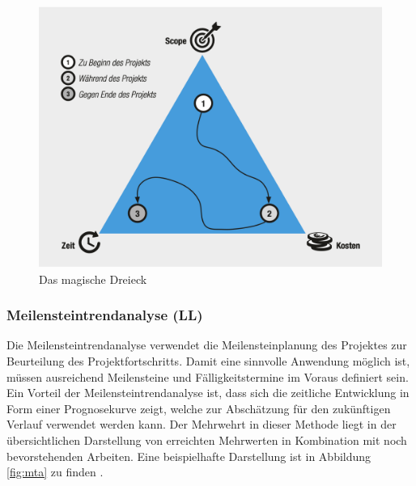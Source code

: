 \documentclass[ThesisDJ.tex]{subfiles}
\begin{document}
    \begin{figure}
        \includegraphics[scale=0.5]{magic_tri.png}
        \centering
        \caption{Das magische Dreieck}
        \label{fig:magic_tri}
    \end{figure}

    \subsubsection{Meilensteintrendanalyse (LL)}
    Die Meilensteintrendanalyse verwendet die Meilensteinplanung des Projektes zur Beurteilung des Projektfortschritts.
    Damit eine sinnvolle Anwendung möglich ist, müssen ausreichend Meilensteine und Fälligkeitstermine im Voraus definiert sein.
    Ein Vorteil der Meilensteintrendanalyse ist, dass sich die zeitliche Entwicklung in Form einer Prognosekurve zeigt, welche 
    zur Abschätzung für den zukünftigen Verlauf verwendet werden kann. Der Mehrwehrt in dieser Methode liegt in der 
    übersichtlichen Darstellung von erreichten Mehrwerten in Kombination mit noch bevorstehenden Arbeiten. Eine beispielhafte Darstellung ist in Abbildung
    \ref{fig:mta} zu finden \cite[S.~192]{kuster_handbuch_2022}.
\end{document}
